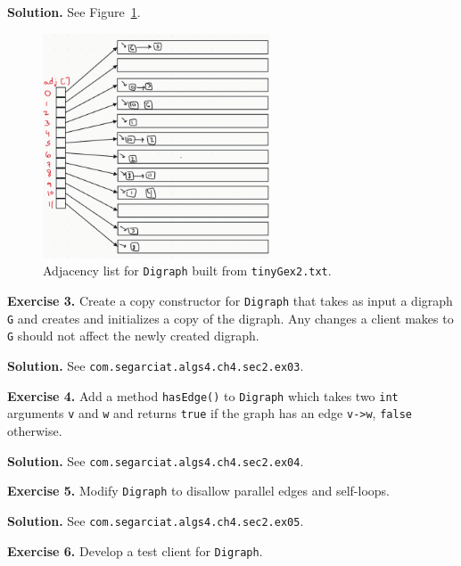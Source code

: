 \documentclass[12pt, a4paper]{article}
\newenvironment{ex}[2][Exercise]
{\par\medskip\noindent \textbf{#1 #2.}}
{\medskip}
\newenvironment{sol}[1][Solution]
{\par\medskip\noindent \textbf{#1.} }
{\medskip}
\begin{document}
	\begin{sol}
		See Figure~\ref{fig:ex-02}.
		\begin{figure}
			\centering
			\includegraphics[width=0.6\textwidth]{exercise-02-adjacency-list}
			\caption{Adjacency list for \texttt{Digraph} built from \texttt{tinyGex2.txt}.}
			\label{fig:ex-02}
		\end{figure}
	\end{sol}
	\begin{ex}{3}
		Create a copy constructor for \texttt{Digraph} that takes as input a digraph
		\texttt{G} and creates and initializes a copy of the digraph. Any changes
		a client makes to \texttt{G} should not affect the newly created digraph.
	\end{ex}
	\begin{sol}
		See \texttt{com.segarciat.algs4.ch4.sec2.ex03}.
	\end{sol}
	\begin{ex}{4}
		Add a method \texttt{hasEdge()} to \texttt{Digraph} which takes two \texttt{int}
		arguments \texttt{v} and \texttt{w} and returns \texttt{true} if the graph has
		an edge \texttt{v->w}, \texttt{false} otherwise.
	\end{ex}
	\begin{sol}
		See \texttt{com.segarciat.algs4.ch4.sec2.ex04}.
	\end{sol}
	\begin{ex}{5}
		Modify \texttt{Digraph} to disallow parallel edges and self-loops.
	\end{ex}
	\begin{sol}
		See \texttt{com.segarciat.algs4.ch4.sec2.ex05}.
	\end{sol}
	\begin{ex}{6}
		Develop a test client for \texttt{Digraph}.
	\end{ex}
\end{document}
